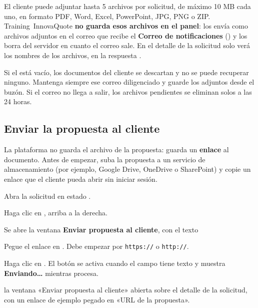 El cliente puede adjuntar hasta 5 archivos por solicitud, de máximo 10 MB cada uno, en formato
PDF, Word, Excel, PowerPoint, JPG, PNG o ZIP. Training~InnovaQuote \textbf{no guarda esos archivos en el
panel}: los envía como archivos adjuntos en el correo  que recibe el \textbf{Correo de notificaciones} () y
los borra del servidor en cuanto el correo sale. En el detalle de la solicitud solo verá los
nombres de los archivos, en la respuesta .

\begin{importante}
Si el  está vacío, los documentos del cliente se descartan y no
se puede recuperar ninguno. Mantenga siempre ese correo diligenciado y guarde los adjuntos
desde el buzón. Si el correo no llega a salir, los archivos pendientes se eliminan solos a las
24 horas.
\end{importante}

\subsection{Enviar la propuesta al cliente}\label{sec:enviar-propuesta}

La plataforma no guarda el archivo de la propuesta: guarda un \textbf{enlace} al documento.
Antes de empezar, suba la propuesta a un servicio de almacenamiento (por ejemplo, Google Drive,
OneDrive o SharePoint) y copie un enlace que el cliente pueda abrir sin iniciar sesión.

\begin{pasos}
  \item Abra la solicitud en estado \pendiente.
  \item Haga clic en , arriba a la derecha.
  \item Se abre la ventana \textbf{Enviar propuesta al cliente}, con el texto
  \item Pegue el enlace en . Debe empezar por \texttt{https://} o
        \texttt{http://}.
  \item Haga clic en . El botón se activa cuando el campo tiene
        texto y muestra \textbf{Enviando…} mientras procesa.
\end{pasos}

  {la ventana «Enviar propuesta al cliente» abierta sobre el detalle de la solicitud, con un
   enlace de ejemplo pegado en «URL de la propuesta».}

